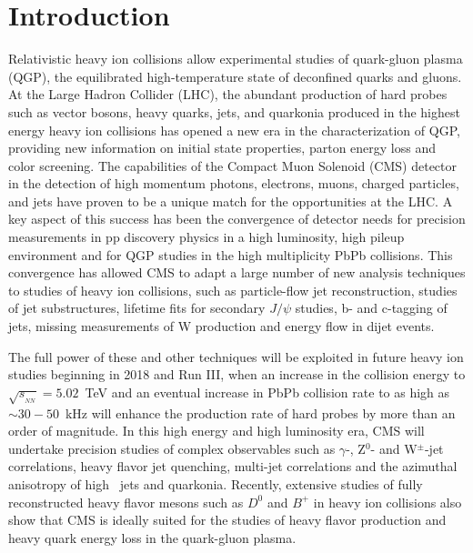 \section{Introduction}
\label{sec:intro}

Relativistic heavy ion collisions allow experimental studies of quark-gluon plasma (QGP), the equilibrated high-temperature state of deconfined quarks and gluons. At the Large Hadron Collider (LHC), the abundant production of hard probes such as vector bosons, heavy quarks, jets, and quarkonia produced in the highest energy heavy ion collisions has opened a new era in the characterization of QGP, providing new information on initial state properties, parton energy loss and color screening. The capabilities of the Compact Muon Solenoid (CMS) detector in the detection of high momentum photons, electrons, muons, charged particles, and jets have proven to be a unique match for the opportunities at the LHC. A key aspect of this success has been the convergence of detector needs for precision measurements in pp discovery physics in a high luminosity, high pileup environment and for QGP studies in the high multiplicity PbPb collisions. This convergence has allowed CMS to adapt a large number of new analysis techniques to studies of heavy ion collisions, such as particle-flow jet reconstruction, studies of jet substructures, lifetime fits for secondary $J/\psi$ studies,  b- and c-tagging of jets, missing \pt measurements of W production and energy flow in dijet events. 

The full power of these and other techniques will be exploited in future heavy ion studies beginning in 2018 and Run III, when an increase in the collision energy to $\sqrt{s_{_{NN}}} = 5.02$~TeV and an eventual increase in PbPb collision rate to as high as $\sim 30-50$~kHz will enhance the production rate of hard probes by more than an order of magnitude. In this high energy and high luminosity era, CMS will undertake precision studies of complex observables such as $\gamma$-, Z$^0$- and W$^\pm$-jet correlations, heavy flavor jet quenching, multi-jet correlations and the azimuthal anisotropy of high \pt\ jets and quarkonia. Recently, extensive studies of fully reconstructed heavy flavor mesons such as $D^0$ and $B^+$ in heavy ion collisions also show that CMS is ideally suited for the studies of heavy flavor production and heavy quark energy loss in the quark-gluon plasma.

